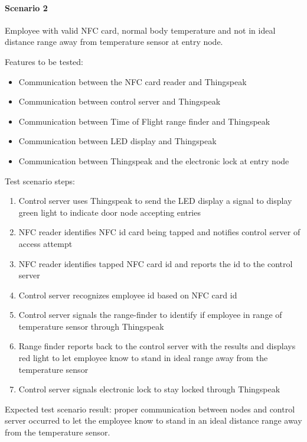 \paragraph{Scenario 2}
Employee with valid NFC card, normal body temperature and not in ideal distance
range away from temperature sensor at entry node.

\noindent
Features to be tested:
\begin{itemize}
    \item Communication between the NFC card reader and Thingspeak
    \item Communication between control server and Thingspeak
    \item Communication between Time of Flight range finder and Thingspeak 
    \item Communication between LED display and Thingspeak 
    \item Communication between Thingspeak and the electronic lock at entry node
\end{itemize}

\noindent
Test scenario steps:
\begin{enumerate}
    \item Control server uses Thingspeak to send the LED display a signal to
          display green light to indicate door node accepting entries
    \item NFC reader identifies NFC id card being tapped and notifies control
          server of access attempt
    \item NFC reader identifies tapped NFC card id and reports the id to the
          control server
    \item Control server recognizes employee id based on NFC card id
    \item Control server signals the range-finder to identify if employee in
          range of temperature sensor through Thingspeak
    \item Range finder reports back to the control server with the results and
          displays red light to let employee know to stand in ideal range away
          from the temperature sensor
    \item Control server signals electronic lock to stay locked through
          Thingspeak
\end{enumerate}

\noindent
Expected test scenario result: proper communication between nodes and control
server occurred to let the employee know to stand in an ideal distance range
away from the temperature sensor.

